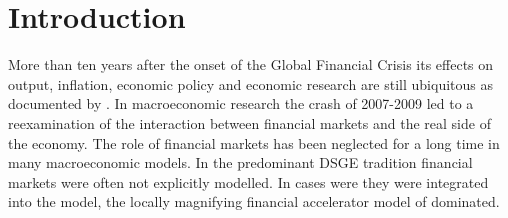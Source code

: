 \documentclass[12pt,letterpaper,fleqn]{article}           %
\begin{document}

\section{Introduction}\label{sec:Introduction}

More than ten years after the onset of the Global Financial Crisis %
its effects on output, inflation, economic policy and economic research are still ubiquitous as documented by \textcite{blanchard17, redmond16}. In macroeconomic research the crash of 2007-2009 led to a reexamination of the interaction between financial markets and the real side of the economy. The role of financial markets has been neglected for a long time in many macroeconomic models. In the predominant DSGE tradition financial markets were often not explicitly modelled. In cases were they were integrated into the model, the locally magnifying financial accelerator model of \textcite{bernanke89, bgg99} dominated. %
\end{document}
